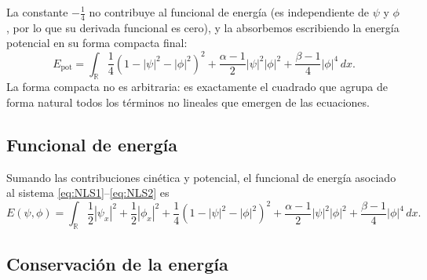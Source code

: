 \documentclass[letterpaper,11pt]{exam}
\theoremstyle{plain}
\begin{document}
La constante $-\frac{1}{4}$ no contribuye al funcional de energía (es independiente de
$\psi$ y $\phi$, por lo que su derivada funcional es cero), y la absorbemos escribiendo
la energía potencial en su forma compacta final:
\begin{equation}
    E_{\mathrm{pot}} = \int_{\mathbb{R}}
    \frac{1}{4}(1-|\psi|^2-|\phi|^2)^2
    + \frac{\alpha-1}{2}|\psi|^2|\phi|^2
    + \frac{\beta-1}{4}|\phi|^4\,dx.
\end{equation}
La forma compacta no es arbitraria: es exactamente el cuadrado que agrupa de forma
natural todos los términos no lineales que emergen de las ecuaciones.

\subsection*{Funcional de energía}

Sumando las contribuciones cinética y potencial, el funcional de energía asociado
al sistema \eqref{eq:NLS1}--\eqref{eq:NLS2} es
\begin{equation}\label{eq:Efinal}
    E(\psi,\phi) = \int_{\mathbb{R}} \frac{1}{2}|\psi_x|^2 + \frac{1}{2}|\phi_x|^2
    + \frac{1}{4}(1-|\psi|^2-|\phi|^2)^2
    + \frac{\alpha-1}{2}|\psi|^2|\phi|^2
    + \frac{\beta-1}{4}|\phi|^4\,dx.
\end{equation}

\subsection*{Conservación de la energía}
\end{document}
